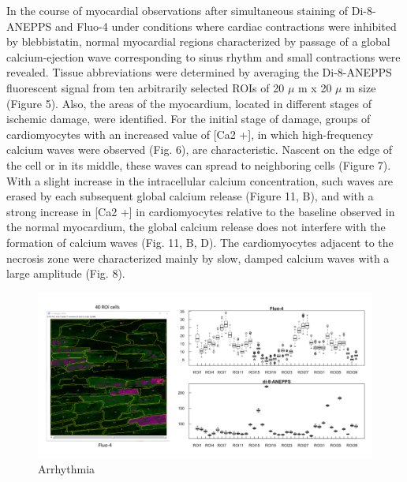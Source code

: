 \documentclass[a4paper,12pt]{article}
\begin{document}
In the course of myocardial observations after simultaneous staining of Di-8-ANEPPS and Fluo-4 under conditions where cardiac contractions were inhibited by blebbistatin, normal myocardial regions characterized by passage of a global calcium-ejection wave corresponding to sinus rhythm and small contractions were revealed. Tissue abbreviations were determined by averaging the Di-8-ANEPPS fluorescent signal from ten arbitrarily selected ROIs of 20 $\mu$ m x 20 $\mu$ m size (Figure 5). Also, the areas of the myocardium, located in different stages of ischemic damage, were identified. For the initial stage of damage, groups of cardiomyocytes with an increased value of [Ca2 +], in which high-frequency calcium waves were observed (Fig. 6), are characteristic. Nascent on the edge of the cell or in its middle, these waves can spread to neighboring cells (Figure 7). With a slight increase in the intracellular calcium concentration, such waves are erased by each subsequent global calcium release (Figure 11, B), and with a strong increase in [Ca2 +] in cardiomyocytes relative to the baseline observed in the normal myocardium, the global calcium release does not interfere with the formation of calcium waves (Fig. 11, B, D). The cardiomyocytes adjacent to the necrosis zone were characterized mainly by slow, damped calcium waves with a large amplitude (Fig. 8).

\begin{figure}
    \includegraphics[width=\linewidth]{fig3.png}
    \caption{Arrhythmia}
    \label{fig:fig3}
\end{figure}
\end{document}
